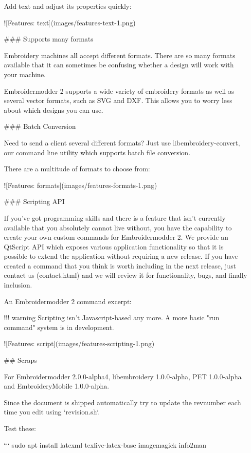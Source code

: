 Add text and adjust its properties quickly:

![Features: text](images/features-text-1.png)

### Supports many formats

Embroidery machines all accept different formats. There are so many formats
available that it can sometimes be confusing whether a design will work with your machine.

Embroidermodder 2 supports a wide variety of embroidery formats as well as several vector
formats, such as SVG and DXF. This allows you to worry less about which designs you can use.

### Batch Conversion

Need to send a client several different formats? Just use libembroidery-convert, our command
line utility which supports batch file conversion.

There are a multitude of formats to choose from:

![Features: formats](images/features-formats-1.png)

### Scripting API

If you've got programming skills and there is a feature that isn't currently available that you
absolutely cannot live without, you have the capability to create your own custom commands for
Embroidermodder 2. We provide an QtScript API which exposes various application functionality
so that it is possible to extend the application without requiring a new release. If you have
created a command that you think is worth including in the next release, just  contact
us (contact.html) and we will review it for functionality, bugs, and finally inclusion.

An Embroidermodder 2 command excerpt:

!!! warning
    Scripting isn't Javascript-based any more. A more basic "run command" system is in development.

![Features: script](images/features-scripting-1.png)


## Scraps

For
Embroidermodder 2.0.0-alpha4, libembroidery 1.0.0-alpha, PET 1.0.0-alpha
and EmbroideryMobile 1.0.0-alpha.

Since the document is shipped automatically try to update the revnumber each
time you edit using `revision.sh`.

Test these:

```
sudo apt install latexml texlive-latex-base imagemagick info2man


